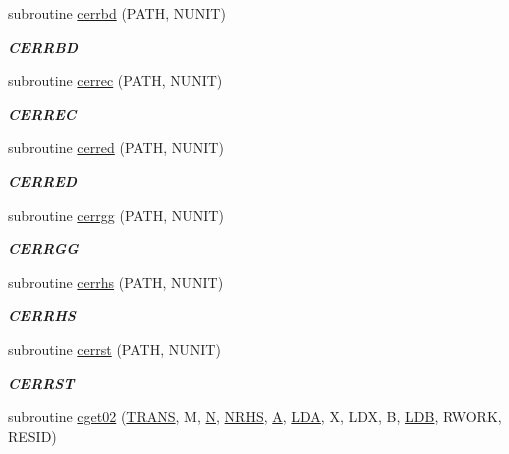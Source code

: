 \begin{DoxyCompactItemize}
subroutine \hyperlink{group__complex__eig_ga50b4c5d969bcab15b8a414bfab72943a}{cerrbd} (P\+A\+T\+H, N\+U\+N\+I\+T)
\begin{DoxyCompactList}\small\item\em {\bfseries C\+E\+R\+R\+B\+D} \end{DoxyCompactList}\item 
subroutine \hyperlink{group__complex__eig_ga5751920655807ca8c7faae007dba9342}{cerrec} (P\+A\+T\+H, N\+U\+N\+I\+T)
\begin{DoxyCompactList}\small\item\em {\bfseries C\+E\+R\+R\+E\+C} \end{DoxyCompactList}\item 
subroutine \hyperlink{group__complex__eig_ga39f3d64318a49dca7ee6ae69057e89d4}{cerred} (P\+A\+T\+H, N\+U\+N\+I\+T)
\begin{DoxyCompactList}\small\item\em {\bfseries C\+E\+R\+R\+E\+D} \end{DoxyCompactList}\item 
subroutine \hyperlink{group__complex__eig_ga5237e7f50365662c99c5af4d41ecb194}{cerrgg} (P\+A\+T\+H, N\+U\+N\+I\+T)
\begin{DoxyCompactList}\small\item\em {\bfseries C\+E\+R\+R\+G\+G} \end{DoxyCompactList}\item 
subroutine \hyperlink{group__complex__eig_gad62986bd8f34d0f8e039c639d25fb926}{cerrhs} (P\+A\+T\+H, N\+U\+N\+I\+T)
\begin{DoxyCompactList}\small\item\em {\bfseries C\+E\+R\+R\+H\+S} \end{DoxyCompactList}\item 
subroutine \hyperlink{group__complex__eig_gaf0c64251a2e100d6629de57e93674dfe}{cerrst} (P\+A\+T\+H, N\+U\+N\+I\+T)
\begin{DoxyCompactList}\small\item\em {\bfseries C\+E\+R\+R\+S\+T} \end{DoxyCompactList}\item 
subroutine \hyperlink{group__complex__eig_gab6d2226b2f8806aa9b110c167c93bedf}{cget02} (\hyperlink{superlu__enum__consts_8h_a0c4e17b2d5cea33f9991ccc6a6678d62a1f61e3015bfe0f0c2c3fda4c5a0cdf58}{T\+R\+A\+N\+S}, M, \hyperlink{polmisc_8c_a0240ac851181b84ac374872dc5434ee4}{N}, \hyperlink{example__user_8c_aa0138da002ce2a90360df2f521eb3198}{N\+R\+H\+S}, \hyperlink{classA}{A}, \hyperlink{example__user_8c_ae946da542ce0db94dced19b2ecefd1aa}{L\+D\+A}, X, L\+D\+X, B, \hyperlink{example__user_8c_a50e90a7104df172b5a89a06c47fcca04}{L\+D\+B}, R\+W\+O\+R\+K, R\+E\+S\+I\+D)

\end{DoxyCompactItemize}
